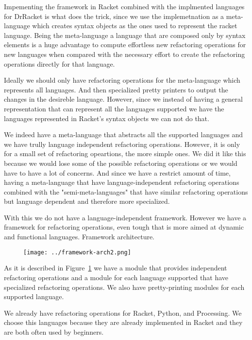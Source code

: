  Impementing the framework in Racket combined with the implmented languages for DrRacket is what does the trick,
 since we use the implemetnation as a meta-language which creates syntax objects as the ones used to represent the racket language.
  Being the meta-language a language that are
 composed only by syntax elements is a huge advantage to compute effortless new
 refactoring operations for new languages when compared with the necessary effort to create
 the refactoring operations directly for that language.

Ideally we should only have refactoring operations for the meta-language which represents
all languages. And then specialized pretty printers to output the changes in the
desireble language.
However, since we instead of having a general representation that can represent all the languages
supported we have the languages represented in Racket's syntax objects we can not do that.

We indeed have a meta-language that abstracts all the supported languages and
we have trully language independent refactoring operations. However, it is only
for a small set of refactoring opeartions, the more simple ones. We did it like
this because we would lose some of the possible refactoring operations or we would
have to have a lot of concerns. And since we have a restrict amount of time, having
a meta-language that have language-independent refactoring operations combined
with the "semi-meta-languages" that have similar refactoring operations but
language dependent and therefore more specialized.

With this we do not have a language-independent framework. However we have a framework
for refactoring operations, even tough that is more aimed at dynamic and functional languages.
Framework architecture.%
\begin{figure}[h]
\texttt{[image: ../framework-arch2.png]}
\label{fig:framework}
\end{figure}

As it is described in Figure~\ref{fig:framework} we have a module that provides
independent refactoring operations and a module for each language supported that
have specialized refactoring operations. We also have pretty-printing modules for
each supported language.

We already have refactoring operations for Racket, Python, and Processing. We choose
this languages because they are already implemented in Racket and they are both
often used by beginners.



